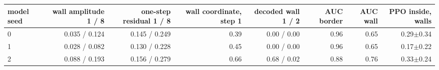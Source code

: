 \begin{tabular}{lrrrrrrr}
\toprule
model seed & wall amplitude 1 / 8 & one-step residual 1 / 8 & wall coordinate, step 1 & decoded wall 1 / 2 & AUC border & AUC wall & PPO inside, walls \\
\midrule
0 & 0.035 / 0.124 & 0.145 / 0.249 & 0.39 & 0.00 / 0.00 & 0.96 & 0.65 & 0.29$\pm$0.34 \\
1 & 0.028 / 0.082 & 0.130 / 0.228 & 0.45 & 0.00 / 0.00 & 0.96 & 0.65 & 0.17$\pm$0.22 \\
2 & 0.088 / 0.193 & 0.156 / 0.279 & 0.66 & 0.68 / 0.02 & 0.88 & 0.76 & 0.33$\pm$0.24 \\
\bottomrule
\end{tabular}
